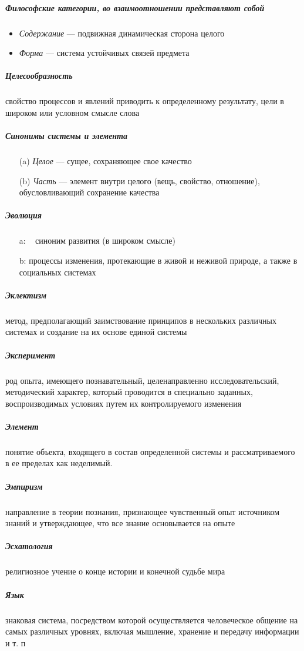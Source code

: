 \documentclass[a4paper, 12pt]{article}
\theoremstyle{plain} %
\theoremstyle{definition} %
\theoremstyle{remark} %
\begin{document}
\subparagraph{Философские категории, во взаимоотношении представляют собой}
\begin{itemize}
	\item \emph{Содержание} --- подвижная динамическая сторона целого
	\item \emph{Форма} ---  система устойчивых связей предмета
\end{itemize}

\subparagraph{Целесообразность}
	свойство процессов и явлений приводить к определенному результату, цели в широком или условном смысле слова

\subparagraph{Синонимы системы и элемента}
\begin{itemize}
	\item[(a)] \emph{Целое} --- сущее, сохраняющее свое качество
	\item[(b)] \emph{Часть} ---  элемент внутри целого (вещь, свойство, отношение), обусловливающий сохранение качества
\end{itemize}

\subparagraph{Эволюция}
\begin{itemize}
	\item[a:] ~ синоним развития (в широком смысле)
	\item[b:] процессы изменения, протекающие в живой и неживой природе, а также в социальных системах
\end{itemize}

\subparagraph{Эклектизм}
	 метод, предполагающий заимствование принципов в нескольких различных системах и создание на их основе единой системы

\subparagraph{Эксперимент}
	род опыта, имеющего познавательный, целенаправленно исследовательский, методический характер, который проводится в специально заданных, воспроизводимых условиях путем их контролируемого изменения

\subparagraph{Элемент}
	понятие объекта, входящего в состав определенной системы и рассматриваемого в ее пределах как неделимый.

\subparagraph{Эмпиризм}
	 направление в теории познания, признающее чувственный опыт источником знаний и утверждающее, что все знание основывается на опыте

\subparagraph{Эсхатология}
	религиозное учение о конце истории и конечной судьбе мира

\subparagraph{Язык}
знаковая система, посредством которой осуществляется человеческое общение на самых различных уровнях, включая мышление, хранение и передачу информации и т. п
\end{document}
